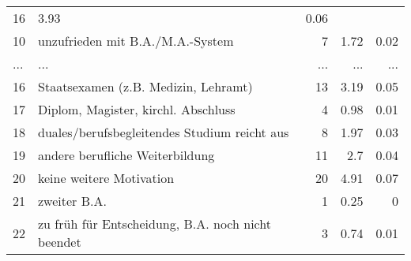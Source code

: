 \begin{longtable}{lXrrr}
          \num{16} &
          \num[round-mode=places,round-precision=2]{3.93} &
          \num[round-mode=places,round-precision=2]{0.06} \\
        10 & \multicolumn{1}{X}{unzufrieden mit B.A./M.A.-System} & %
          \num{7} &
          \num[round-mode=places,round-precision=2]{1.72} &
          \num[round-mode=places,round-precision=2]{0.02} \\
       ... & ... & ... & ... & ... \\
        16 & \multicolumn{1}{X}{Staatsexamen (z.B. Medizin, Lehramt)} & %
          \num{13} &
          \num[round-mode=places,round-precision=2]{3.19} &
          \num[round-mode=places,round-precision=2]{0.05} \\

        17 & \multicolumn{1}{X}{Diplom, Magister, kirchl. Abschluss} & %
          \num{4} &
          \num[round-mode=places,round-precision=2]{0.98} &
          \num[round-mode=places,round-precision=2]{0.01} \\

        18 & \multicolumn{1}{X}{duales/berufsbegleitendes Studium reicht aus} & %
          \num{8} &
          \num[round-mode=places,round-precision=2]{1.97} &
          \num[round-mode=places,round-precision=2]{0.03} \\

        19 & \multicolumn{1}{X}{andere berufliche Weiterbildung} & %
          \num{11} &
          \num[round-mode=places,round-precision=2]{2.7} &
          \num[round-mode=places,round-precision=2]{0.04} \\

        20 & \multicolumn{1}{X}{keine weitere Motivation} & %
          \num{20} &
          \num[round-mode=places,round-precision=2]{4.91} &
          \num[round-mode=places,round-precision=2]{0.07} \\

        21 & \multicolumn{1}{X}{zweiter B.A.} & %
          \num{1} &
          \num[round-mode=places,round-precision=2]{0.25} &
          \num[round-mode=places,round-precision=2]{0} \\

        22 & \multicolumn{1}{X}{zu früh für Entscheidung, B.A. noch nicht beendet} & %
          \num{3} &
          \num[round-mode=places,round-precision=2]{0.74} &
          \num[round-mode=places,round-precision=2]{0.01} \\


\end{longtable}
